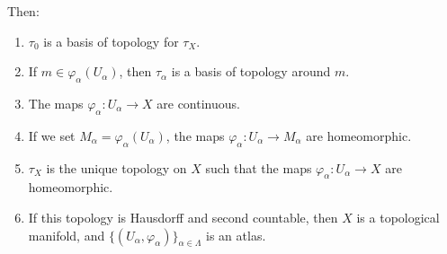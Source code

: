 \begin{theorem}
	Then:
	\begin{enumerate}
		\item		\label{ITEMooLNAPooIZVFVZ}
		      \( \tau_0\) is a basis of topology for \( \tau_X\).
		\item		\label{ITEMooRSZOooFfNrCQ}
		      If \( m\in\varphi_{\alpha}(U_{\alpha})\), then \( \tau_{\alpha}\) is a basis of topology around \( m\).
		\item\label{ITEMooXGDRooRWiVnF}
		      The maps \(\varphi_{\alpha} \colon U_{\alpha}\to X  \) are continuous.
		\item \label{ITEMooPPZIooViYPck}
		      If we set \( M_{\alpha}=\varphi_{\alpha}(U_{\alpha})\), the maps \(\varphi_{\alpha} \colon U_{\alpha}\to M_{\alpha} \) are homeomorphic.
		\item		\label{ITEMooCMUKooBvlXbs}
		      \( \tau_X\) is the unique topology on \( X\) such that the maps \(\varphi_{\alpha} \colon U_{\alpha} \to X  \) are homeomorphic.
		\item	\label{ITEMooAZHPooWzAjlS}
		      If this topology is Hausdorff and second countable, then \( X\) is a topological manifold, and \( \{ (U_{\alpha}, \varphi_{\alpha}) \}_{\alpha\in\Lambda}\) is an atlas.
	\end{enumerate}
\end{theorem}

